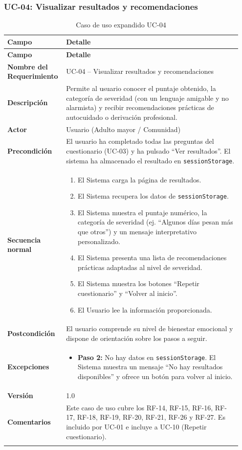 \subsubsection{UC-04: Visualizar resultados y recomendaciones}

\begin{longtable}{p{0.22\linewidth} p{0.73\linewidth}}
\toprule
\rowcolor{tableheader!20}
\textbf{Campo} & \textbf{Detalle} \\
\midrule
\endfirsthead
\rowcolor{tableheader!20}
\textbf{Campo} & \textbf{Detalle} \\
\midrule
\endhead
\bottomrule
\endfoot
\textbf{Nombre del Requerimiento} & UC-04 -- Visualizar resultados y recomendaciones \\
\textbf{Descripción} & Permite al usuario conocer el puntaje obtenido, la categoría de severidad (con un lenguaje amigable y no alarmista) y recibir recomendaciones prácticas de autocuidado o derivación profesional. \\
\textbf{Actor} & Usuario (Adulto mayor / Comunidad) \\
\textbf{Precondición} & El usuario ha completado todas las preguntas del cuestionario (UC-03) y ha pulsado ``Ver resultados''. El sistema ha almacenado el resultado en \texttt{sessionStorage}. \\
\textbf{Secuencia normal} & 
  \begin{enumerate}
    \item El Sistema carga la página de resultados.
    \item El Sistema recupera los datos de \texttt{sessionStorage}.
    \item El Sistema muestra el puntaje numérico, la categoría de severidad (ej. ``Algunos días pesan más que otros'') y un mensaje interpretativo personalizado.
    \item El Sistema presenta una lista de recomendaciones prácticas adaptadas al nivel de severidad.
    \item El Sistema muestra los botones ``Repetir cuestionario'' y ``Volver al inicio''.
    \item El Usuario lee la información proporcionada.
  \end{enumerate} \\
\textbf{Postcondición} & El usuario comprende su nivel de bienestar emocional y dispone de orientación sobre los pasos a seguir. \\
\textbf{Excepciones} & 
  \begin{itemize}
    \item \textbf{Paso 2:} No hay datos en \texttt{sessionStorage}. El Sistema muestra un mensaje ``No hay resultados disponibles'' y ofrece un botón para volver al inicio.
  \end{itemize} \\
\textbf{Versión} & 1.0 \\
\textbf{Comentarios} & Este caso de uso cubre los RF-14, RF-15, RF-16, RF-17, RF-18, RF-19, RF-20, RF-21, RF-26 y RF-27. Es incluido por UC-01 e incluye a UC-10 (Repetir cuestionario). \\
\bottomrule
\caption{Caso de uso expandido UC-04}
\label{tab:uc04}
\end{longtable}

